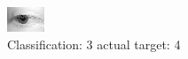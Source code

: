 \begin{figure}[h!]
\begin{center}
\includegraphics[width=0.60\columnwidth]{figures/ID2569_class_3_target_4.png}
\end{center}
\caption{ Classification: 3 actual target: 4}
\label{fig:ID2569_class_3_target_4}
\end{figure}

